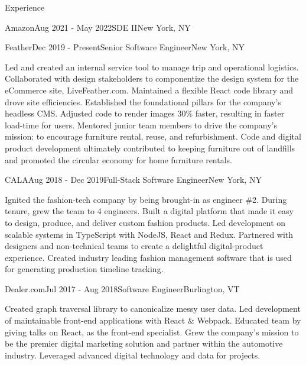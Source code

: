 \documentclass{resume} %
\begin{document}
\begin{rSection}{Experience}
\begin{rSubsection}{Amazon}{Aug 2021 - May 2022}{SDE II}{New York, NY}
\end{rSubsection}


\begin{rSubsection}{Feather}{Dec 2019 - Present}{Senior Software Engineer}{New York, NY}

Led and created an internal service tool to manage trip and operational logistics.
Collaborated with design stakeholders to componentize the design system for the eCommerce
site, LiveFeather.com. Maintained a flexible React code library and drove site efficiencies.
Established the foundational pillars for the company’s headless CMS. Adjusted code to render
images 30\% faster, resulting in faster load-time for users. Mentored junior team members to
drive the company’s mission: to encourage furniture rental, reuse, and refurbishment. Code
and digital product development ultimately contributed to keeping furniture out of landfills
and promoted the circular economy for home furniture rentals.

\end{rSubsection}


\begin{rSubsection}{CALA}{Aug 2018 - Dec 2019}{Full-Stack Software Engineer}{New York, NY}

Ignited the fashion-tech company by being brought-in as engineer \#2. During tenure, grew
the team to 4 engineers. Built a digital platform that made it easy to design, produce,
and deliver custom fashion products. Led development on scalable systems in TypeScript with
NodeJS, React and Redux. Partnered with designers and non-technical teams to create a
delightful digital-product experience. Created industry leading fashion management software
that is used for generating production timeline tracking.

\end{rSubsection}


\begin{rSubsection}{Dealer.com}{Jul 2017 - Aug 2018}{Software Engineer}{Burlington, VT}

Created graph traversal library to canonicalize messy user data. Led development of
maintainable front-end applications with React \& Webpack. Educated team by giving talks
on React, as the front-end specialist. Grew the company’s mission to be the premier
digital marketing solution and partner within the automotive industry. Leveraged
advanced digital technology and data for projects.


\end{rSubsection}
\end{rSection}
\end{document}
